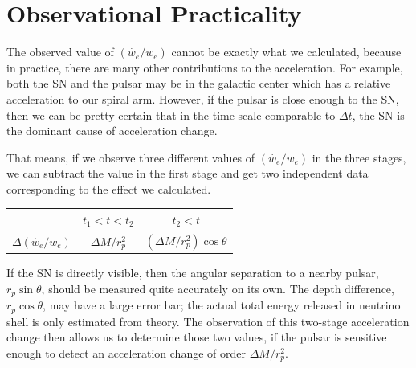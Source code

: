 \documentclass[aps,showpacs,twocolumn,floats,prd,superscriptaddress,nofootinbib]{revtex4-1}
\begin{document}
\section{Observational Practicality}
\label{sec-obs}

The observed value of $(\dot{w_e}/w_e)$ cannot be exactly what we calculated, because in practice, there are many other contributions to the acceleration. For example, both the SN and the pulsar may be in the galactic center which has a relative acceleration to our spiral arm. However, if the pulsar is close enough to the SN, then we can be pretty certain that in the time scale comparable to $\Delta t$, the SN is the dominant cause of acceleration change. %

That means, if we observe three different values of $(\dot{w_e}/w_e)$ in the three stages, we can subtract the value in the first stage and get two independent data corresponding to the effect we calculated.
\begin{center}
\begin{tabular}{| c | c | c |} 
\hline
                & $t_1<t<t_2$ & $t_2<t$ \\ 
       \hline 
$\Delta(\dot{w_e}/w_e)$ & $ \Delta M/r_p^2$ 
& $(\Delta M/r_p^2)\cos\theta$   \\ 
\hline 
\end{tabular}
\end{center}

If the SN is directly visible, then the angular separation to a nearby pulsar, $r_p\sin\theta$, should be measured quite accurately on its own. The depth difference, $r_p\cos\theta$, may have a large error bar; the actual total energy released in neutrino shell is only estimated from theory. The observation of this two-stage acceleration change then allows us to determine those two values, if the pulsar is sensitive enough to detect an acceleration change of order $\Delta M/r_p^2$.
\end{document}
